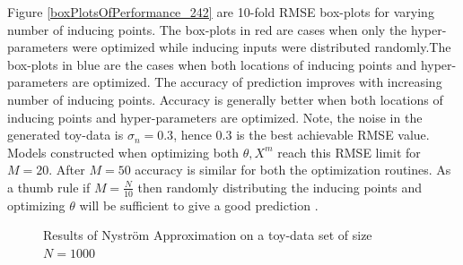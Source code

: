 Figure \ref{boxPlotsOfPerformance_242} are 10-fold RMSE box-plots for varying number of inducing points. The box-plots in red are cases when only the hyper-parameters were optimized while inducing inputs were distributed randomly.The box-plots in blue are the cases when both locations of inducing points and hyper-parameters are optimized. The accuracy of prediction improves with increasing number of inducing points. Accuracy is generally better when both locations of inducing points and hyper-parameters are optimized. Note, the noise in the generated toy-data is \(\sigma_{n}=0.3\), hence \(0.3\) is the best achievable RMSE value. Models constructed when optimizing both \(\theta, X^{m}\) reach this RMSE limit for \(M = 20\). After \(M=50\) accuracy is similar for both the optimization routines. As a thumb rule if \(M = \frac{N}{10}\) then randomly distributing the inducing points and optimizing \(\theta\) will be sufficient to give a good prediction \cite{cao2013efficient}. 

\begin{figure}[!ht]
  \centering
    \quad
{}\quad
  
       \caption{Results of Nystr\"{o}m Approximation on a toy-data set of size \(N=1000\) }\label{figGPPredictionNystorm}
\end{figure}

